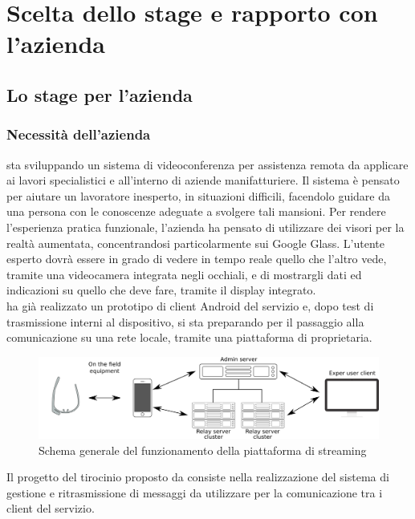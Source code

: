 \chapter{Scelta dello stage e rapporto con l'azienda}

\section{Lo stage per l'azienda}

   \subsection{Necessità dell'azienda}
   \nomeAzienda{} sta sviluppando un sistema di videoconferenza per assistenza remota da applicare ai lavori specialistici e all'interno di aziende manifatturiere. Il sistema è pensato per aiutare un lavoratore inesperto, in situazioni difficili, facendolo guidare da una persona con le conoscenze adeguate a svolgere tali mansioni. Per rendere l'esperienza pratica funzionale, l'azienda ha pensato di utilizzare dei visori per la realtà aumentata, concentrandosi particolarmente sui Google Glass. L'utente esperto dovrà essere in grado di vedere in tempo reale quello che l'altro vede, tramite una videocamera integrata negli occhiali, e di mostrargli dati ed indicazioni su quello che deve fare, tramite il display integrato.
   \\
   \nomeAzienda{} ha già realizzato un prototipo di client Android del servizio e, dopo test di trasmissione interni al dispositivo, si sta preparando per il passaggio alla comunicazione su una rete locale, tramite una piattaforma di   proprietaria.
   \begin{figure}[H]
      \begin{center}
         \includegraphics[width=16.5cm,keepaspectratio]{immagini/erastreaming-schema}
      \end{center}         
      \caption{Schema generale del funzionamento della piattaforma di streaming}
   \end{figure}
   Il progetto del tirocinio proposto da \nomeAzienda{} consiste nella realizzazione del sistema di gestione e ritrasmissione di messaggi da utilizzare per la comunicazione tra i client del servizio.

